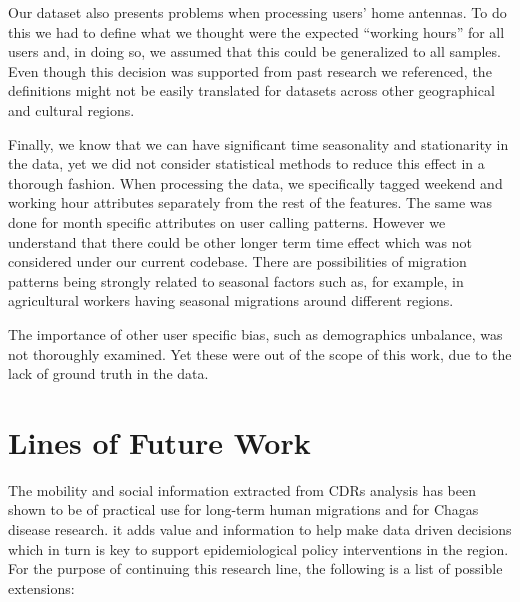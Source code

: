 Our dataset also presents problems when processing users' home antennas.
To do this we had to define what we thought were the expected ``working hours'' for all users and, in doing so, we assumed that this could be generalized to all samples. %
Even though this decision was supported from past research we referenced, the definitions might not be easily translated for datasets across other geographical and cultural regions.


Finally, we know that we can have significant time seasonality and stationarity in the data, yet we did not consider statistical methods to reduce this effect in a thorough fashion. %
When processing the data, we specifically tagged weekend and working hour attributes separately from the rest of the features.
The same was done for month specific attributes on user calling patterns.
However we understand that there could be other longer term time effect which was not considered under our current codebase. %
There are possibilities of migration patterns being strongly related to seasonal factors such as, for example, in agricultural workers having seasonal migrations around different regions.%

The importance of other user specific bias, such as demographics unbalance, was not thoroughly examined.
Yet these were out of the scope of this work, due to the lack of ground truth in the data.




\section{ Lines of Future Work }


The mobility and social information extracted from CDRs analysis has been shown to be of practical use for long-term human migrations and for Chagas disease research.
it adds value and information to help make data driven decisions which in turn is key to support epidemiological policy interventions in the region.
For the purpose of continuing this research line, the following is a list of possible extensions:


